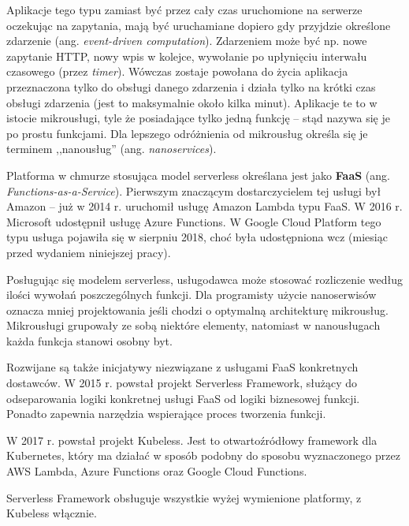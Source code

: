 \documentclass[12pt,a4paper,twoside,titlepage,openright]{book}
\begin{document}
Aplikacje tego typu zamiast być przez cały czas uruchomione na serwerze oczekując na zapytania, mają być uruchamiane dopiero gdy przyjdzie określone zdarzenie (ang. \textit{event-driven computation}). Zdarzeniem może być np. nowe zapytanie HTTP, nowy wpis w kolejce, wywołanie po upłynięciu interwału czasowego (przez \textit{timer}). Wówczas zostaje powołana do życia aplikacja przeznaczona tylko do obsługi danego zdarzenia i działa tylko na krótki czas obsługi zdarzenia (jest to maksymalnie około kilka minut). Aplikacje te to w istocie mikrousługi, tyle że posiadające tylko jedną funkcję -- stąd nazywa się je po prostu funkcjami. Dla lepszego odróżnienia od mikrousług określa się je terminem ,,nanousług'' (ang. \textit{nanoservices}). \cite{serverlessMaddie, ccResearchSpringer, distributedSystems}

Platforma w chmurze stosująca model serverless określana jest jako \textbf{FaaS} (ang. \textit{Functions-as-a-Service}). Pierwszym znaczącym dostarczycielem tej usługi był Amazon -- już w 2014 r. uruchomił usługę Amazon Lambda typu FaaS. W 2016 r. Microsoft udostępnił usługę Azure Functions. W Google Cloud Platform tego typu usługa pojawiła się w sierpniu 2018, choć była udostępniona wcz (miesiąc przed wydaniem niniejszej pracy).

Posługując się modelem serverless, usługodawca może stosować rozliczenie według ilości wywołań poszczególnych funkcji. Dla programisty użycie nanoserwisów oznacza mniej projektowania jeśli chodzi o optymalną architekturę mikrousług. Mikrousługi grupowały ze sobą niektóre elementy, natomiast w nanousługach każda funkcja stanowi osobny byt. 

Rozwijane są także inicjatywy niezwiązane z usługami FaaS konkretnych dostawców. W 2015 r. powstał projekt Serverless Framework,\cite{siteServerlessFramework} służący do odseparowania logiki konkretnej usługi FaaS od logiki biznesowej funkcji. Ponadto zapewnia narzędzia wspierające proces tworzenia funkcji. 

W 2017 r. powstał projekt Kubeless.\cite{siteKubelessReleases} Jest to otwartoźródłowy framework dla Kubernetes, który ma działać w sposób podobny do sposobu wyznaczonego przez AWS Lambda, Azure Functions oraz Google Cloud Functions.\cite{distributedSystems} 

Serverless Framework obsługuje wszystkie wyżej wymienione platformy, z Kubeless włącznie.\cite{siteServerlessFramework}



\end{document}
